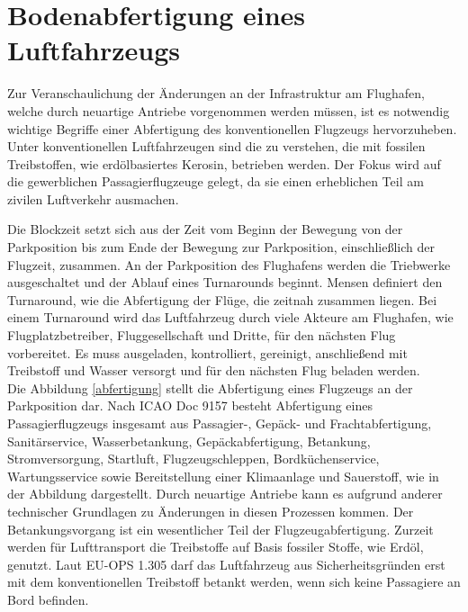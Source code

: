 \section{Bodenabfertigung eines Luftfahrzeugs}
\label{s:Bodenabfertigung eines Luftfahrzeugs}

Zur Veranschaulichung der Änderungen an der Infrastruktur am Flughafen, 
welche durch neuartige Antriebe vorgenommen werden müssen, ist es notwendig 
wichtige Begriffe einer Abfertigung des konventionellen Flugzeugs hervorzuheben. 
Unter konventionellen Luftfahrzeugen sind die zu verstehen,
die mit fossilen Treibstoffen, wie erdölbasiertes Kerosin, betrieben werden. 
Der Fokus wird auf die gewerblichen Passagierflugzeuge gelegt,
da sie einen erheblichen Teil am zivilen Luftverkehr ausmachen. %

Die Blockzeit setzt sich aus der Zeit vom Beginn der Bewegung von der Parkposition 
bis zum Ende der Bewegung zur Parkposition, einschließlich der Flugzeit, zusammen.
An der Parkposition des Flughafens werden die Triebwerke ausgeschaltet 
und der Ablauf eines Turnarounds beginnt. 
Mensen \cite{mensen2013handbuch} definiert den Turnaround, 
wie die Abfertigung der Flüge, die zeitnah zusammen liegen. %
Bei einem Turnaround wird das Luftfahrzeug durch viele Akteure am Flughafen, 
wie Flugplatzbetreiber, Fluggesellschaft und Dritte, für den nächsten Flug vorbereitet. 
Es muss ausgeladen, kontrolliert, gereinigt, anschließend mit Treibstoff und Wasser versorgt %
und für den nächsten Flug beladen werden.\\

Die Abbildung \ref{abfertigung} stellt die Abfertigung eines Flugzeugs an der Parkposition dar.
Nach ICAO Doc 9157 besteht Abfertigung eines Passagierflugzeugs 
insgesamt aus Passagier-, Gepäck- und Frachtabfertigung, Sanitärservice, Wasserbetankung, 
Gepäckabfertigung, Betankung, Stromversorgung, Startluft, Flugzeugschleppen, 
Bordküchenservice, Wartungsservice sowie Bereitstellung einer Klimaanlage und Sauerstoff,
wie in der Abbildung dargestellt. Durch neuartige Antriebe kann es aufgrund anderer 
technischer Grundlagen zu Änderungen in diesen Prozessen kommen.
%
Der Betankungsvorgang ist ein wesentlicher Teil der Flugzeugabfertigung. 
Zurzeit werden für Lufttransport die Treibstoffe auf Basis fossiler Stoffe, wie Erdöl, genutzt. 
Laut EU-OPS 1.305 darf das Luftfahrzeug aus Sicherheitsgründen erst mit dem konventionellen Treibstoff betankt werden, 
wenn sich keine Passagiere an Bord befinden. 
%

